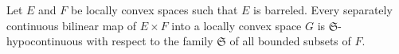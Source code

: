 Let $E$ and $F$ be locally convex spaces such that $E$ is barreled. Every separately continuous bilinear map of $E \times F$ into a locally convex space $G$ is $\mathfrak{S}$-hypocontinuous with respect to the family $\mathfrak{S}$ of all bounded subsets of $F$.
